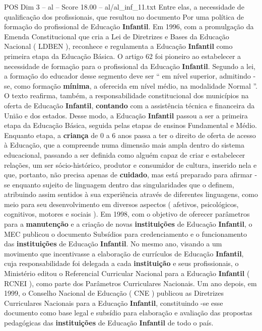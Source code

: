 \begin{textsample}{POS Dim 3 – al – Score 18.00 – al/al\_inf\_11.txt}
Entre elas, a necessidade de qualificação dos profissionais, que resultou no documento Por uma política de formação do profissional de Educação \textbf{Infantil}.
Em 1996, com a promulgação da Emenda Constitucional que cria a Lei de Diretrizes e Bases da Educação Nacional ( LDBEN ), reconhece e regulamenta a Educação \textbf{Infantil} como primeira etapa da Educação Básica.
O artigo 62 foi pioneiro ao estabelecer a necessidade de formação para o profissional da Educação \textbf{Infantil}.
Segundo a lei, a formação do educador desse segmento deve ser “ em nível superior, admitindo -se, como formação \textbf{mínima}, a oferecida em nível médio, na modalidade Normal ”.
O texto reafirma, também, a responsabilidade constitucional dos municípios na oferta de Educação \textbf{Infantil}, \textbf{contando} com a assistência técnica e financeira da União e dos estados.
Desse modo, a Educação \textbf{Infantil} passou a ser a primeira etapa da Educação Básica, seguida pelas etapas de ensinos Fundamental e Médio.
Enquanto etapa, a \textbf{criança} de 0 a 6 anos passa a ter o direito de oferta de acesso à Educação, que a compreende numa dimensão mais ampla dentro do sistema educacional, passando a ser definida como alguém capaz de criar e estabelecer relações, um ser sócio-histórico, produtor e consumidor de cultura, inserido nela e que, portanto, não precisa apenas de \textbf{cuidado}, mas está preparado para afirmar -se enquanto sujeito de linguagem dentro das singularidades que o definem, atribuindo assim sentidos à sua experiência através de diferentes linguagens, como meio para seu desenvolvimento em diversos aspectos ( afetivos, psicológicos, cognitivos, motores e sociais ).
Em 1998, com o objetivo de oferecer parâmetros para a \textbf{manutenção} e a criação de novas \textbf{instituições} de Educação \textbf{Infantil}, o MEC publicou o documento Subsídios para credenciamento e o funcionamento das \textbf{instituições} de Educação \textbf{Infantil}.
No mesmo ano, visando a um movimento que incentivasse a elaboração de currículos de Educação \textbf{Infantil}, cuja responsabilidade foi delegada a cada \textbf{instituição} e seus profissionais, o Ministério editou o Referencial Curricular Nacional para a Educação \textbf{Infantil} ( RCNEI ), como parte dos Parâmetros Curriculares Nacionais.
Um ano depois, em 1999, o Conselho Nacional de Educação ( CNE ) publicou as Diretrizes Curriculares Nacionais para a Educação \textbf{Infantil}, constituindo -se esse documento como base legal e subsídio para elaboração e avaliação das propostas pedagógicas das \textbf{instituições} de Educação \textbf{Infantil} de todo o país.

\end{textsample}
